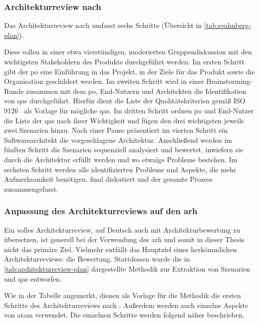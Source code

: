 \subsubsection{Architekturreview nach }

Das Architekturreview nach   umfasst sechs Schritte (Übersicht in \cref{tab:svahnberg-plan}).

Diese sollen in einer etwa vierstündigen, mo\-de\-rierten Gruppendiskussion mit den wichtigsten Stakeholdern des Produkts durchgeführt werden.
Im ersten Schritt gibt der \gls{po} eine Einführung in das Projekt, in der Ziele für das Produkt sowie die Organisation geschildert werden.
Im zweiten Schritt wird in einer Brainstorming-Runde zusammen mit dem \gls{po}, End-Nutzern und Architekten die Identifikation von \glspl{qa} durchgeführt.
Hierfür dient die Liste der Qualitätskriterien gemäß ISO 9126~\cite{ISO-9126} als Vorlage für mögliche \glspl{qa}.
Im dritten Schritt ordnen \gls{po} und End-Nutzer die Liste der \glspl{qa} nach ihrer Wichtigkeit und fügen den drei wichtigsten jeweils zwei Szenarien hinzu.
Nach einer Pause präsentiert im vierten Schritt ein Softwarearchitekt die vorgeschlagene Architektur.
Anschließend werden im fünften Schritt die Szenarien sequenziell analysiert und bewertet, inwiefern sie durch die Architektur erfüllt werden und wo etwaige Probleme bestehen.
Im sechsten Schritt werden alle identifizierten Probleme und Aspekte, die mehr Aufmerksamkeit benötigen, final diskutiert und der gesamte Prozess zusammengefasst.

\subsubsection{Anpassung des Architekturreviews auf den \gls{arh}}

Ein volles Architekturreview, auf Deutsch auch mit Architekturbewertung zu übersetzen, ist generell bei der Verwendung des \gls{arh} und somit in dieser Thesis nicht das primäre Ziel.
Vielmehr entfällt das Hauptziel eines herkömmlichen Architekturreviews: die Bewertung.
Stattdessen wurde die in \cref{tab:architekturreview-plan} dargestellte Methodik zur Extraktion von Szenarien und \glspl{qa} entworfen.


Wie in der Tabelle angemerkt, dienen als Vorlage für die Methodik die ersten Schritte des Architekturreviews nach .
Außerdem werden auch einzelne Aspekte von \gls{atam} \cite{kazman_2000} verwendet.
Die einzelnen Schritte werden folgend näher beschrieben.

